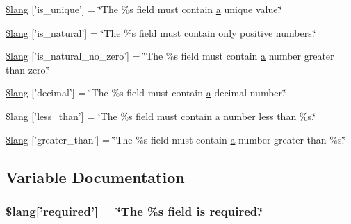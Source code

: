 \begin{DoxyCompactItemize}
\item 
\hyperlink{form__validation__lang_8php_aadc3e586aaac175b851ee4bcd0c26ef2}{\$lang} \mbox{[}'is\-\_\-unique'\mbox{]} = \char`\"{}The \%s field must contain \hyperlink{bootstrap_8min_8js_a7318f59fb86a4437995ee89c780c51ac}{a} unique value.\char`\"{}
\item 
\hyperlink{form__validation__lang_8php_a0d61ebbd2ae667c2cccf29c316b6a382}{\$lang} \mbox{[}'is\-\_\-natural'\mbox{]} = \char`\"{}The \%s field must contain only positive numbers.\char`\"{}
\item 
\hyperlink{form__validation__lang_8php_a0956fbaf56ed9b9598a43ea9e9014727}{\$lang} \mbox{[}'is\-\_\-natural\-\_\-no\-\_\-zero'\mbox{]} = \char`\"{}The \%s field must contain \hyperlink{bootstrap_8min_8js_a7318f59fb86a4437995ee89c780c51ac}{a} number greater than zero.\char`\"{}
\item 
\hyperlink{form__validation__lang_8php_a1926dbdd7b5919a5e1a966d6ec18c9e4}{\$lang} \mbox{[}'decimal'\mbox{]} = \char`\"{}The \%s field must contain \hyperlink{bootstrap_8min_8js_a7318f59fb86a4437995ee89c780c51ac}{a} decimal number.\char`\"{}
\item 
\hyperlink{form__validation__lang_8php_a6037a90e37e5d1bd139c641ae955f2b9}{\$lang} \mbox{[}'less\-\_\-than'\mbox{]} = \char`\"{}The \%s field must contain \hyperlink{bootstrap_8min_8js_a7318f59fb86a4437995ee89c780c51ac}{a} number less than \%s.\char`\"{}
\item 
\hyperlink{form__validation__lang_8php_a6e4bd5ad6a3238d9be1ca6f810eac978}{\$lang} \mbox{[}'greater\-\_\-than'\mbox{]} = \char`\"{}The \%s field must contain \hyperlink{bootstrap_8min_8js_a7318f59fb86a4437995ee89c780c51ac}{a} number greater than \%s.\char`\"{}
\end{DoxyCompactItemize}


\subsection{Variable Documentation}
\hypertarget{form__validation__lang_8php_ac05864968b28fa7a4476f49e6b8d4433}{
\subsubsection[{\$lang}]{\setlength{\rightskip}{0pt plus 5cm}\$lang\mbox{[}'required'\mbox{]} = \char`\"{}The \%s field is required.\char`\"{}}}\label{form__validation__lang_8php_ac05864968b28fa7a4476f49e6b8d4433}


